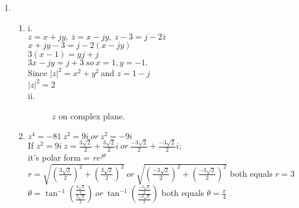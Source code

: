 \documentclass[10pt,a4paper, margin=1in]{article}
\begin{document}
\begin{enumerate}
\item %
    \begin{enumerate}
    \item %
    i.\\
    \(z=x+jy,\ \overline{z}=x-jy,\ z-3=j-2\overline{z} \)\\
    \(x+jy-3=j-2(x-jy)\)\\
    \(3(x-1)=yj+j\)\\
    \(3x-jy=j+3\ so\ x=1, y=-1. \)\\
    Since \(|z|^2=x^2+y^2\ \)and \(z=1-j\)\\
    \(|z|^2=2\)\\
    ii.\\
    \begin{figure}[h!]
    \centering
        \caption{ $z$ on complex plane.}
        \label{fig:q2}
    \end{figure}
    \item %
    \(z^4=-81\ z^2=9i\ or\ z^2=-9i\)\\
    If \(z^2=9i\ z=\frac{3\sqrt{2}}{2}+\frac{3\sqrt{2}}{2}i\ or\ \frac{-3\sqrt{2}}{2}+\frac{-3\sqrt{2}}{2}i\);\\
    it's polar form = \(re^{j\theta}\)\\
    \(r=\sqrt{(\frac{3\sqrt{2}}{2})^2+(\frac{3\sqrt{2}}{2})^2}\ or\ \sqrt{(\frac{-3\sqrt{2}}{2})^2+(\frac{-3\sqrt{2}}{2})^2}\) both equals \(r=3\)\\
    \(\theta=\tan^{-1}(\frac{\frac{3\sqrt{2}}{2}}{\frac{3\sqrt{2}}{2}})\ or\ 
    \tan^{-1}(\frac{\frac{-3\sqrt{2}}{2}}{\frac{-3\sqrt{2}}{2}})\) both equals \(\theta=\frac{\pi}{4}\)\\

\end{enumerate}
\end{enumerate}
\end{document}
